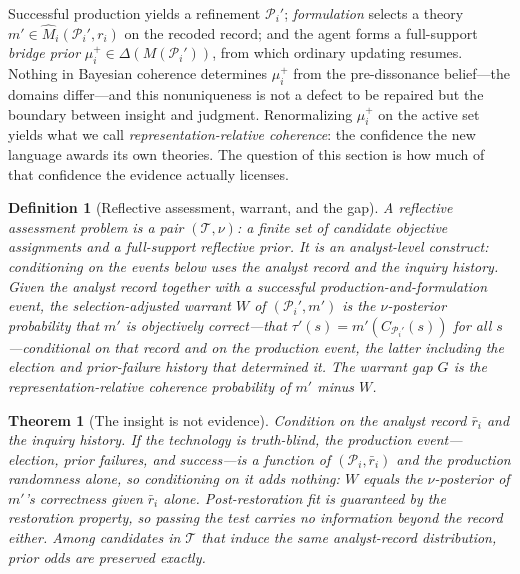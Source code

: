 \documentclass[11pt]{article}
\newtheorem{definition}[assumption]{Definition}
\newtheorem{theorem}[assumption]{Theorem}
\theoremstyle{definition}
\begin{document}
Successful production yields a refinement $\mathcal P_i'$; \emph{formulation}
selects a theory $m'\in\widehat M_i(\mathcal P_i',r_i)$ on the recoded
record; and the agent forms a full-support \emph{bridge prior}
$\mu_i^{+}\in\Delta(M(\mathcal P_i'))$, from which ordinary updating
resumes.  Nothing in Bayesian coherence determines $\mu_i^{+}$ from the
pre-dissonance belief---the domains differ---and this nonuniqueness is not a
defect to be repaired but the boundary between insight and judgment.
Renormalizing $\mu_i^{+}$ on the active set yields what we call
\emph{representation-relative coherence}: the confidence the new language
awards its own theories.  The question of this section is how much of that
confidence the evidence actually licenses.

\begin{definition}[Reflective assessment, warrant, and the gap]
\label{def:warrant}
A reflective assessment problem is a pair $(\mathcal T,\nu)$: a finite set of
candidate objective assignments and a full-support reflective prior.  It is an
\emph{analyst-level} construct: conditioning on the events below uses the
analyst record and the inquiry history.  Given the analyst record together
with a successful production-and-formulation event, the
\emph{selection-adjusted warrant} $W$ of $(\mathcal P_i',m')$ is the
$\nu$-posterior probability that $m'$ is objectively correct---that
$\tau'(s)=m'(C_{\mathcal P_i'}(s))$ for all $s$---conditional on that record
\emph{and} on the production event, the latter including the election and
prior-failure history that determined it.  The \emph{warrant gap} $G$ is the
representation-relative coherence probability of $m'$ minus $W$.
\end{definition}

\begin{theorem}[The insight is not evidence]
\label{thm:uninformative}
Condition on the analyst record $\bar r_i$ and the inquiry history.  If the
technology is truth-blind, the production event---election, prior failures,
and success---is a function of $(\mathcal P_i,\bar r_i)$ and the production
randomness alone, so conditioning on it adds nothing: $W$ equals the
$\nu$-posterior of $m'$'s correctness given $\bar r_i$ alone.  Post-restoration
fit is guaranteed by the restoration property, so passing the test carries no
information beyond the record either.  Among candidates in $\mathcal T$ that
induce the same analyst-record distribution, prior odds are preserved exactly.
\end{theorem}
\end{document}
